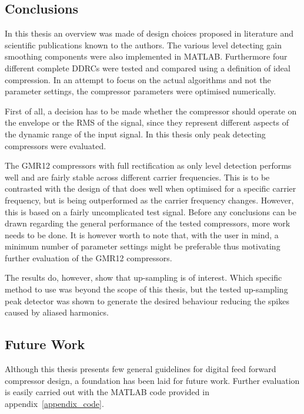 \documentclass[../main2.tex]{subfiles}
\begin{document}
\subsection{Conclusions}\label{discussion_conclusions}
In this thesis an overview was made of design choices proposed in literature and scientific publications known to the authors. The various level detecting gain smoothing components were also implemented in MATLAB\textsuperscript{\textregistered}. Furthermore four different complete DDRCs were tested and compared using a definition of ideal compression. In an attempt to focus on the actual algorithms and not the parameter settings, the compressor parameters were optimised numerically.

First of all, a decision has to be made whether the compressor should operate on the envelope or the RMS of the signal, since they represent different aspects of the dynamic range of the input signal. In this thesis only peak detecting compressors were evaluated.

The GMR12 compressors with full rectification as only level detection performs well and are fairly stable across different carrier frequencies.  This is to be contrasted with the design of \cite{mcnally1984dynamic} that does well when optimised for a specific carrier frequency, but is being outperformed as the carrier frequency changes. However, this is based on a fairly uncomplicated test signal. Before any conclusions can be drawn regarding the general performance of the tested compressors, more work needs to be done. It is however worth to note that, with the user in mind, a minimum number of parameter settings might be preferable thus motivating further evaluation of the GMR12 compressors.

The results do, however, show that up-sampling is of interest. Which specific method to use was beyond the scope of this thesis, but the tested up-sampling peak detector was shown to generate the desired behaviour reducing the spikes caused by aliased harmonics.


\subsection{Future Work}\label{discussion_future_work}
Although this thesis presents few general guidelines for digital feed forward compressor design, a foundation has been laid for future work. Further evaluation is easily carried out with the MATLAB\textsuperscript{\textregistered} code provided in appendix~\ref{appendix_code}.
\end{document}
